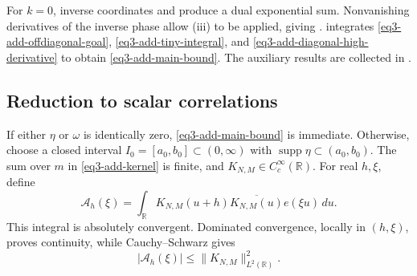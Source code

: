 \documentclass[reqno,12pt]{amsart}
\def \R {\mathbb R}
\numberwithin{equation}{section}
\begin{document}
For $k=0$, inverse coordinates and 
produce a dual exponential sum. Nonvanishing derivatives of the inverse
phase allow (iii) to be applied, giving
.  integrates
\eqref{eq3-add-offdiagonal-goal}, \eqref{eq3-add-tiny-integral}, and
\eqref{eq3-add-diagonal-high-derivative} to obtain
\eqref{eq3-add-main-bound}. The auxiliary results are collected in
.

\subsection{Reduction to scalar correlations}\label{sec3:scalar}

If either $\eta$ or $\omega$ is identically zero,
\eqref{eq3-add-main-bound} is immediate. Otherwise,
choose a closed interval $I_0=[a_0,b_0]\subset(0,\infty)$ with
$\operatorname{supp}\eta\subset(a_0,b_0)$.
The sum over $m$ in \eqref{eq3-add-kernel} is finite, and
$K_{N,M}\in C_c^\infty(\R)$.
For real $h,\xi$, define
\begin{equation}
 \mathcal A_h(\xi)=\int_\R
 K_{N,M}(u+h)\overline{K_{N,M}(u)}e(\xi u)\,du.
 \label{eq3-add-correlation}
\end{equation}
This integral is absolutely convergent. Dominated convergence, locally
in $(h,\xi)$, proves continuity, while Cauchy--Schwarz gives
$$|\mathcal A_h(\xi)|\le\|K_{N,M}\|_{L^2(\R)}^2.$$
\end{document}
